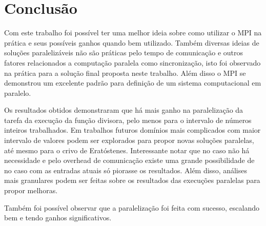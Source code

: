 \documentclass[12pt]{article}
\begin{document}


\section{Conclusão}
\label{sec:conclusao}


Com este trabalho foi possível ter uma melhor ideia sobre como utilizar o MPI na prática e seus possíveis ganhos quando bem utilizado. Também diversas ideias de soluções paralelizáveis não são práticas pelo tempo de comunicação e outros fatores relacionados a computação paralela como sincronização, isto foi observado na prática para a solução final proposta neste trabalho. Além disso o MPI se demonstrou um excelente padrão para definição de um sistema computacional em paralelo.

Os resultados obtidos demonstraram que há mais ganho na paralelização da tarefa da execução da função divisora, pelo menos para o intervalo de números inteiros trabalhados. Em trabalhos futuros domínios mais complicados com maior intervalo de valores podem ser explorados para propor novas soluções paralelas, até mesmo para o crivo de Eratóstenes. Interessante notar que no caso não há necessidade e pelo overhead de comunicação existe uma grande possibilidade de no caso com as entradas atuais só piorasse os resultados. Além disso, análises mais granulares podem ser feitas sobre os  resultados das execuções paralelas para propor melhoras.

Também foi possível observar que a paralelização foi feita com sucesso, escalando bem e tendo ganhos significativos.



\end{document}
